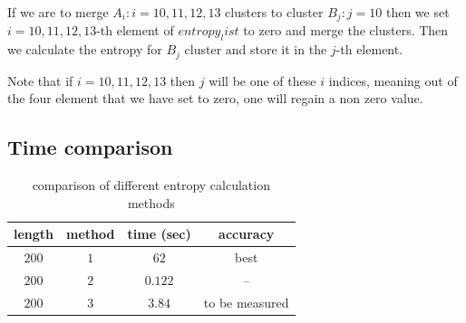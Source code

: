	If we are to merge $A_i : i={10,11,12,13}$ clusters to cluster $B_j : j = {10}$ then we set $i={10,11,12,13}$-th element of $entropy_list$ to zero and merge the clusters. Then we calculate the entropy for $B_j$ cluster and store it in the $j$-th element.
	
	Note that if $i={10,11,12,13}$ then $j$ will be one of these $i$ indices, meaning out of the four element that we have set to zero, one will regain a non zero value.
	
	\subsection{Time comparison}
	\begin{table}
		\centering
		\begin{tabular}{c|c|c|c}
			length & method &  time (sec) & accuracy \\
			\hline
			$200$ & $1$ & $62$ & best\\
			$200$ & $2$ & $0.122$ &	--\\
			$200$ & $3$ & $3.84$ & to be measured
		\end{tabular}
	\caption{comparison of different entropy calculation methods}
	\end{table}

%
